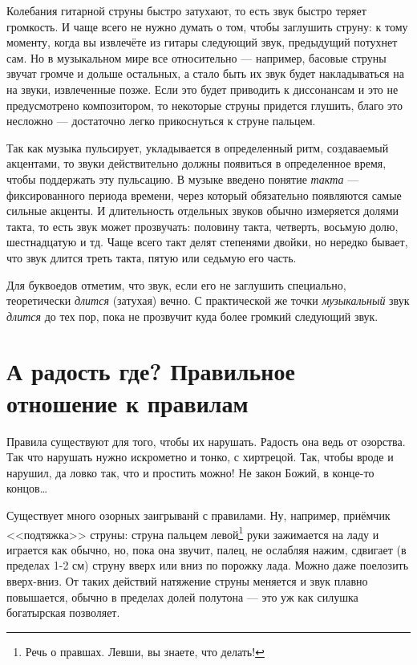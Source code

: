 Колебания гитарной струны быстро затухают, то есть звук быстро теряет громкость. И чаще всего не нужно думать о том, чтобы заглушить струну: к тому моменту, когда вы извлечёте из гитары следующий звук, предыдущий потухнет сам. Но в музыкальном мире все относительно --- например, басовые струны звучат громче и дольше остальных, а стало быть их звук будет накладываться на на звуки, извлеченные позже. Если это будет приводить к диссонансам и это не предусмотрено композитором, то некоторые струны придется глушить, благо это несложно --- достаточно легко прикоснуться к струне пальцем.

Так как музыка пульсирует, укладывается в определенный ритм, создаваемый акцентами, то звуки действительно должны появиться в определенное время, чтобы поддержать эту пульсацию. В музыке введено понятие \emph{такта} --- фиксированного периода времени, через который обязательно появляются самые сильные акценты. И длительность отдельных звуков обычно измеряется долями такта, то есть звук может прозвучать: половину такта, четверть, восьмую долю, шестнадцатую и тд. Чаще всего такт делят степенями двойки, но нередко бывает, что звук длится треть такта, пятую или седьмую его часть.

Для буквоедов отметим, что звук, если его не заглушить специально, теоретически \emph{длится} (затухая) вечно. С практической же точки \emph{музыкальный} звук \emph{длится} до тех пор, пока не прозвучит куда более громкий следующий звук. 


\section{А радость где? Правильное отношение к правилам}
\label{ch:music:rules}

Правила существуют для того, чтобы их нарушать. Радость она ведь от озорства. Так что нарушать нужно искрометно и тонко, с хиртрецой. Так, чтобы вроде и нарушил, да ловко так, что и простить можно! Не закон Божий, в конце-то концов\ldots

Существует много озорных заигрыванй с правилами. Ну, например, приёмчик <<подтяжка>> струны: струна пальцем левой\footnote{Речь о правшах. Левши, вы знаете, что делать!} руки зажимается на ладу и играется как обычно, но, пока она звучит, палец, не ослабляя нажим, сдвигает (в пределах 1-2 см) струну вверх или вниз по порожку лада. Можно даже поелозить вверх-вниз. От таких действий натяжение струны меняется и звук плавно повышается, обычно в пределах долей полутона --- это уж как силушка богатырская позволяет. 

